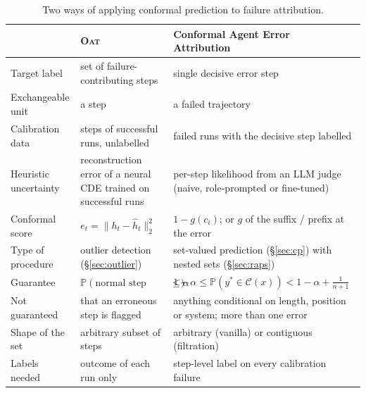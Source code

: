 \documentclass[11pt]{article}
\theoremstyle{definition}
\newcommand{\C}{\mathcal{C}}
\newcommand{\PP}{\mathbb{P}}
\newcommand{\ystar}{y^*}
\begin{document}
\begin{table}[H]
\centering\small
\renewcommand{\arraystretch}{1.15}
\begin{tabular}{@{}p{3.1cm}p{5.6cm}p{6.1cm}@{}}\toprule
 & \textsc{Oat}~\cite{oat} & Conformal Agent Error Attribution~\cite{caea}\\\midrule
Target label & set of failure-contributing steps & single decisive error step\\
Exchangeable unit & a step & a failed trajectory\\
Calibration data & steps of successful runs, unlabelled & failed runs with the decisive step labelled\\
Heuristic uncertainty & reconstruction error of a neural CDE trained on successful runs & per-step likelihood from an LLM judge (naive, role-prompted or fine-tuned)\\
Conformal score & $e_t=\|h_t-\hat h_t\|_2^2$ & $1-g(c_i)$; or $g$ of the suffix / prefix at the error\\
Type of procedure & outlier detection (\S\ref{sec:outlier}) & set-valued prediction (\S\ref{sec:cp}) with nested sets (\S\ref{sec:raps})\\
Guarantee & $\PP(\text{normal step flagged})\le\alpha$ & $1-\alpha\le\PP(\ystar\in\C(x))<1-\alpha+\frac1{n+1}$\\
Not guaranteed & that an erroneous step is flagged & anything conditional on length, position or system; more than one error\\
Shape of the set & arbitrary subset of steps & arbitrary (vanilla) or contiguous (filtration)\\
Labels needed & outcome of each run only & step-level label on every calibration failure\\\bottomrule
\end{tabular}
\caption{Two ways of applying conformal prediction to failure attribution.}
\label{tab:compare}
\end{table}
\end{document}
